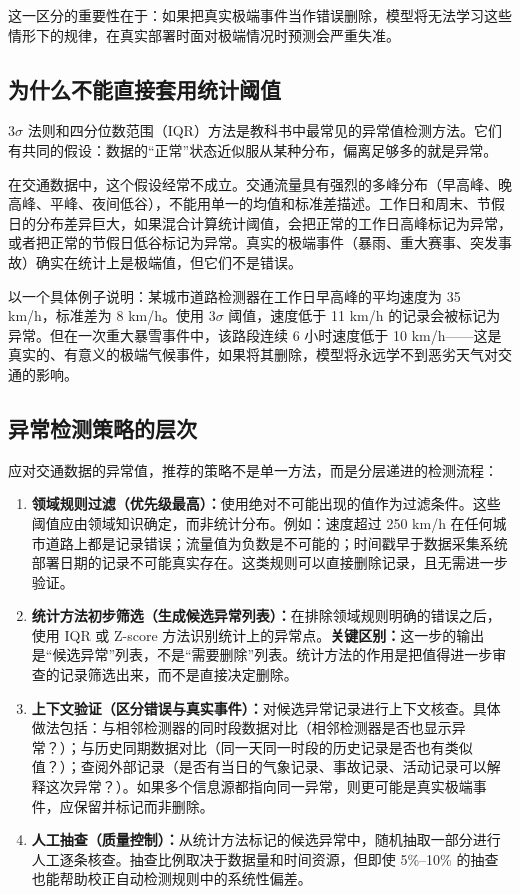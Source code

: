 这一区分的重要性在于：如果把真实极端事件当作错误删除，模型将无法学习这些情形下的规律，在真实部署时面对极端情况时预测会严重失准。

\subsection{为什么不能直接套用统计阈值}

$3\sigma$ 法则和四分位数范围（IQR）方法是教科书中最常见的异常值检测方法。它们有共同的假设：数据的“正常”状态近似服从某种分布，偏离足够多的就是异常。

在交通数据中，这个假设经常不成立。交通流量具有强烈的多峰分布（早高峰、晚高峰、平峰、夜间低谷），不能用单一的均值和标准差描述。工作日和周末、节假日的分布差异巨大，如果混合计算统计阈值，会把正常的工作日高峰标记为异常，或者把正常的节假日低谷标记为异常。真实的极端事件（暴雨、重大赛事、突发事故）确实在统计上是极端值，但它们不是错误。

以一个具体例子说明：某城市道路检测器在工作日早高峰的平均速度为 35 km/h，标准差为 8 km/h。使用 $3\sigma$ 阈值，速度低于 11 km/h 的记录会被标记为异常。但在一次重大暴雪事件中，该路段连续 6 小时速度低于 10 km/h——这是真实的、有意义的极端气候事件，如果将其删除，模型将永远学不到恶劣天气对交通的影响。

\subsection{异常检测策略的层次}

应对交通数据的异常值，推荐的策略不是单一方法，而是分层递进的检测流程：

\begin{enumerate}
  \item \textbf{领域规则过滤（优先级最高）：}使用绝对不可能出现的值作为过滤条件。这些阈值应由领域知识确定，而非统计分布。例如：速度超过 250 km/h 在任何城市道路上都是记录错误；流量值为负数是不可能的；时间戳早于数据采集系统部署日期的记录不可能真实存在。这类规则可以直接删除记录，且无需进一步验证。
  \item \textbf{统计方法初步筛选（生成候选异常列表）：}在排除领域规则明确的错误之后，使用 IQR 或 Z-score 方法识别统计上的异常点。\textbf{关键区别：}这一步的输出是“候选异常”列表，不是“需要删除”列表。统计方法的作用是把值得进一步审查的记录筛选出来，而不是直接决定删除。
  \item \textbf{上下文验证（区分错误与真实事件）：}对候选异常记录进行上下文核查。具体做法包括：与相邻检测器的同时段数据对比（相邻检测器是否也显示异常？）；与历史同期数据对比（同一天同一时段的历史记录是否也有类似值？）；查阅外部记录（是否有当日的气象记录、事故记录、活动记录可以解释这次异常？）。如果多个信息源都指向同一异常，则更可能是真实极端事件，应保留并标记而非删除。
  \item \textbf{人工抽查（质量控制）：}从统计方法标记的候选异常中，随机抽取一部分进行人工逐条核查。抽查比例取决于数据量和时间资源，但即使 5\%--10\% 的抽查也能帮助校正自动检测规则中的系统性偏差。
\end{enumerate}

